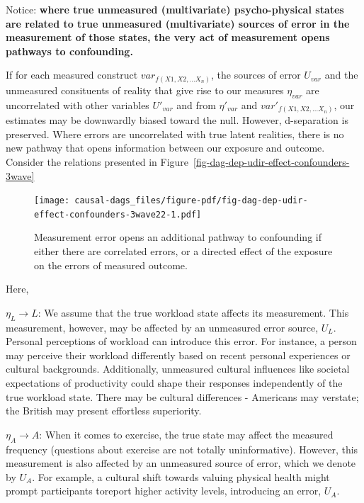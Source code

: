 \documentclass[
  singlecolumn]{report}
\begin{document}
Notice: \textbf{where true unmeasured (multivariate) psycho-physical
states are related to true unmeasured (multivariate) sources of error in
the measurement of those states, the very act of measurement opens
pathways to confounding.}

If for each measured construct \(var_{f(X1, X2,\dots X_n)}\), the
sources of error \(U_{var}\) and the unmeasured consituents of reality
that give rise to our measures \(\eta_{var}\) are uncorrelated with
other variables \(U\prime_{var}\) and from \(\eta\prime_{var}\) and
\(var\prime_{f(X1, X2,\dots X_n)}\), our estimates may be downwardly
biased toward the null. However, d-separation is preserved. Where errors
are uncorrelated with true latent realities, there is no new pathway
that opens information between our exposure and outcome. Consider the
relations presented in
Figure~\ref{fig-dag-dep-udir-effect-confounders-3wave}

\begin{figure}

{\centering \texttt{[image: causal-dags\_files/figure-pdf/fig-dag-dep-udir-effect-confounders-3wave22-1.pdf]}

}

\caption{\label{fig-dag-dep-udir-effect-confounders-3wave22}Measurement
error opens an additional pathway to confounding if either there are
correlated errors, or a directed effect of the exposure on the errors of
measured outcome.}

\end{figure}

Here,

\(\eta_L \rightarrow L\): We assume that the true workload state affects
its measurement. This measurement, however, may be affected by an
unmeasured error source, \(U_{L}\). Personal perceptions of workload can
introduce this error. For instance, a person may perceive their workload
differently based on recent personal experiences or cultural
backgrounds. Additionally, unmeasured cultural influences like societal
expectations of productivity could shape their responses independently
of the true workload state. There may be cultural differences -
Americans may verstate; the British may present effortless superiority.

\(\eta_A \rightarrow A\): When it comes to exercise, the true state may
affect the measured frequency (questions about exercise are not totally
uninformative). However, this measurement is also affected by an
unmeasured source of error, which we denote by \(U_{A}\). For example, a
cultural shift towards valuing physical health might prompt participants
toreport higher activity levels, introducing an error, \(U_{A}\).
\end{document}
